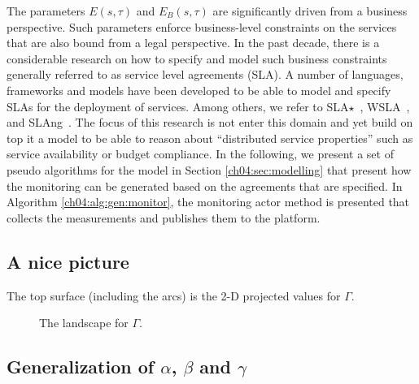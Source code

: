 The parameters $E(s,\tau)$ and $E_B(s,\tau)$ are significantly driven from a business perspective.
Such parameters enforce business-level constraints on the services that are also bound from a legal perspective.
In the past decade, there is a considerable research on how to specify and model such business constraints generally referred to as service level agreements (SLA).
A number of languages, frameworks and models have been developed to be able to model and specify SLAs for the deployment of services.
Among others, we refer to SLA$\star$~\cite{kearney2010sla}, WSLA~\cite{keller2003wsla}, and SLAng~\cite{lamanna2003slang}.
The focus of this research is not enter this domain and yet build on top it a model to be able to reason about ``distributed service properties'' such as service availability or budget compliance. 
In the following, we present a set of pseudo algorithms for the model in Section \ref{ch04:sec:modelling} that present how the monitoring can be generated based on the agreements that are specified. 
In Algorithm \ref{ch04:alg:gen:monitor}, the monitoring actor method  is presented that collects the measurements and publishes them to the platform.



% 

\subsection*{A nice picture}

The top surface (including the arcs) is the 2-D projected values for $\Gamma$.
% 
\begin{figure}[h]
\centering
{}
\caption{
The landscape for $\Gamma$.
} 
\label{ch04:fig:sustain:factor}
\end{figure}
% 

\subsection{Generalization of $\alpha$, $\beta$ and $\gamma$}


